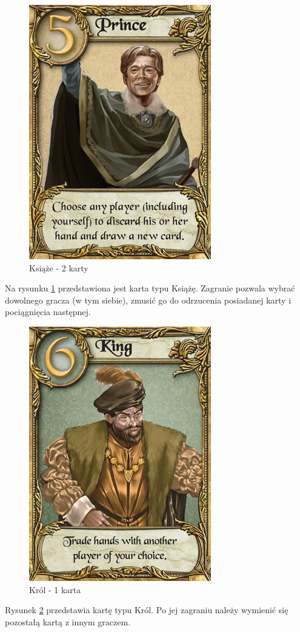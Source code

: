 \clearpage
\begin{figure}[h]
	\centering
	\includegraphics[scale=0.5]{Resources/Love_Letter_Card_Prince.png}
	\caption{Książe - 2 karty} \label{fig:Love_Letter_Card_Prince}
\end{figure}
Na rysunku \ref{fig:Love_Letter_Card_Prince} przedstawiona jest karta typu Książę. Zagranie pozwala wybrać dowolnego gracza (w tym siebie), zmusić go do odrzucenia posiadanej karty i pociągnięcia następnej.

\begin{figure}[h]
	\centering
	\includegraphics[scale=0.5]{Resources/Love_Letter_Card_King.png}
	\caption{Król - 1 karta} \label{fig:Love_Letter_Card_King}
\end{figure}
Rysunek \ref{fig:Love_Letter_Card_King} przedstawia kartę typu Król. Po jej zagraniu należy wymienić się pozostałą kartą z innym graczem.

